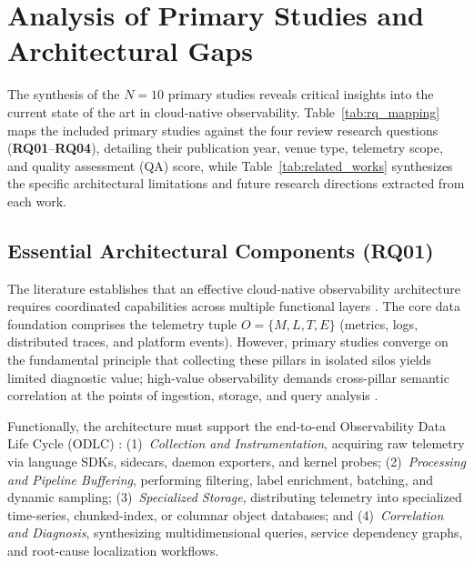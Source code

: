 \section{Analysis of Primary Studies and Architectural Gaps}
\label{sec:analysis-studies}

The synthesis of the $N = 10$ primary studies reveals critical insights into the current state of the art in cloud-native observability. Table~\ref{tab:rq_mapping} maps the included primary studies against the four review research questions (\textbf{RQ01}--\textbf{RQ04}), detailing their publication year, venue type, telemetry scope, and quality assessment (QA) score, while Table~\ref{tab:related_works} synthesizes the specific architectural limitations and future research directions extracted from each work.



\subsection{Essential Architectural Components (RQ01)}
The literature establishes that an effective cloud-native observability architecture requires coordinated capabilities across multiple functional layers \cite{kosinska_2023, usman_2022, faseeha_2025}. The core data foundation comprises the telemetry tuple $O = \{M, L, T, E\}$ (metrics, logs, distributed traces, and platform events). However, primary studies converge on the fundamental principle that collecting these pillars in isolated silos yields limited diagnostic value; high-value observability demands cross-pillar semantic correlation at the points of ingestion, storage, and query analysis \cite{gomes_2025, araujo_2024}.

Functionally, the architecture must support the end-to-end Observability Data Life Cycle (ODLC) \cite{araujo_2024, han_2024}: (1)~\textit{Collection and Instrumentation}, acquiring raw telemetry via language SDKs, sidecars, daemon exporters, and kernel probes; (2)~\textit{Processing and Pipeline Buffering}, performing filtering, label enrichment, batching, and dynamic sampling; (3)~\textit{Specialized Storage}, distributing telemetry into specialized time-series, chunked-index, or columnar object databases; and (4)~\textit{Correlation and Diagnosis}, synthesizing multidimensional queries, service dependency graphs, and root-cause localization workflows.

